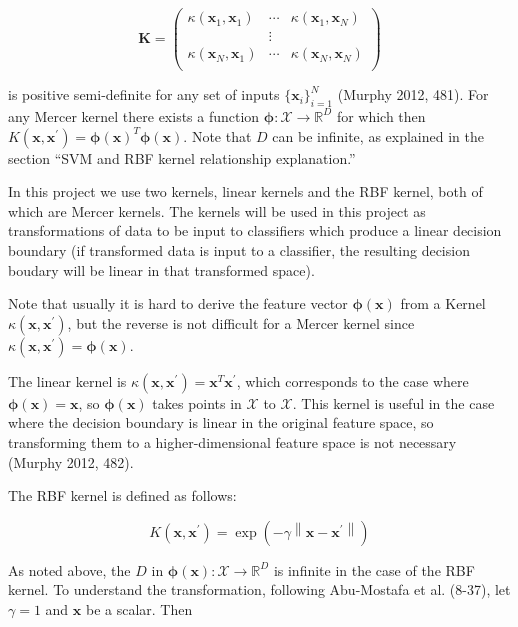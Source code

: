 \documentclass[letterpaper, 12pt]{article}
\newcommand{\norm}[1]{\left\lVert #1 \right\rVert}
\newcommand{\vect}[1]{\boldsymbol{#1}}
\begin{document}
\begin{equation*}
  \vect{K} = \begin{pmatrix}
    \kappa(\vect{x}_1, \vect{x}_1) & \cdots & \kappa(\vect{x}_1, \vect{x}_N) \\
    & \vdots & \\
    \kappa(\vect{x}_N, \vect{x}_1) & \cdots & \kappa(\vect{x}_N, \vect{x}_N) \\    
  \end{pmatrix}
\end{equation*}

is positive semi-definite for any set of inputs $\{\vect{x}_i\}_{i=1}^N$ (Murphy 2012, 481). For any Mercer kernel there exists a function $\vect{\phi}: \mathcal{X} \rightarrow \mathbb{R}^D$ for which then $K(\vect{x}, \vect{x}^\prime) = \vect{\phi}(\vect{x})^T\vect{\phi}(\vect{x})$. Note that $D$ can be infinite, as explained in the section ``SVM and RBF kernel relationship explanation.''

In this project we use two kernels, linear kernels and the RBF kernel, both of which are Mercer kernels. The kernels will be used in this project as transformations of data to be input to classifiers which produce a linear decision boundary (if transformed data is input to a classifier, the resulting decision boudary will be linear in that transformed space).

Note that usually it is hard to derive the feature vector $\vect{\phi}(\vect{x})$ from a Kernel $\kappa(\vect{x}, \vect{x}^\prime)$, but the reverse is not difficult for a Mercer kernel since $\kappa(\vect{x}, \vect{x}^\prime) = \vect{\phi}(\vect{x})$.

The linear kernel is $\kappa(\vect{x}, \vect{x}^\prime) = \vect{x}^T\vect{x}^\prime$, which corresponds to the case where $\vect{\phi}(\vect{x}) = \vect{x}$, so $\vect{\phi}(\vect{x})$ takes points in $\mathcal{X}$ to $\mathcal{X}$. This kernel is useful in the case where the decision boundary is linear in the original feature space, so transforming them to a higher-dimensional feature space is not necessary (Murphy 2012, 482).

The RBF kernel is defined as follows:

\begin{equation*}
  K(\vect{x}, \vect{x}^\prime) = \exp\left(-\gamma \norm{\vect{x} - \vect{x}^\prime}\right)
\end{equation*}

As noted above, the $D$ in $\vect{\phi}(\vect{x}): \mathcal{X} \rightarrow \mathbb{R}^D$ is infinite in the case of the RBF kernel. To understand the transformation, following Abu-Mostafa et al. (8-37), let $\gamma = 1$ and $\vect{x}$ be a scalar. Then
\end{document}
